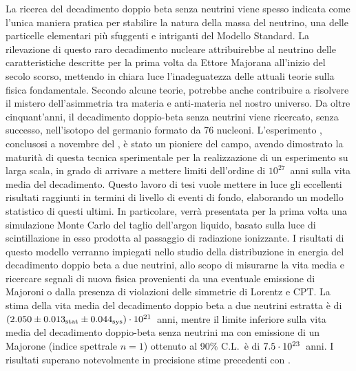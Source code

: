 
La ricerca del decadimento doppio beta senza neutrini viene spesso indicata come l'unica
maniera pratica per stabilire la natura della massa del neutrino, una delle particelle
elementari più sfuggenti e intriganti del Modello Standard. La rilevazione di questo raro
decadimento nucleare attribuirebbe al neutrino delle caratteristiche descritte per la
prima volta da Ettore Majorana all'inizio del secolo scorso, mettendo in chiara luce
l'inadeguatezza delle attuali teorie sulla fisica fondamentale. Secondo alcune teorie,
potrebbe anche contribuire a risolvere il mistero dell'asimmetria tra materia e
anti-materia nel nostro universo. Da oltre cinquant'anni, il decadimento doppio-beta senza
neutrini viene ricercato, senza successo, nell'isotopo del germanio formato da 76
nucleoni. L'esperimento \gerda, conclusosi a novembre del , è stato un pioniere
del campo, avendo dimostrato la maturità di questa tecnica sperimentale per la
realizzazione di un esperimento su larga scala, in grado di arrivare a mettere limiti
dell'ordine di $10^{27}$~anni sulla vita media del decadimento.  Questo lavoro di tesi
vuole mettere in luce gli eccellenti risultati raggiunti in termini di livello di eventi
di fondo, elaborando un modello statistico di questi ultimi. In particolare, verrà
presentata per la prima volta una simulazione Monte Carlo del taglio dell'argon liquido,
basato sulla luce di scintillazione in esso prodotta al passaggio di radiazione
ionizzante. I risultati di questo modello verranno impiegati nello studio della
distribuzione in energia del decadimento doppio beta a due neutrini, allo scopo di
misurarne la vita media e ricercare segnali di nuova fisica provenienti da una eventuale
emissione di Majoroni o dalla presenza di violazioni delle simmetrie di Lorentz e CPT. La
stima della vita media del decadimento doppio beta a due neutrini estratta è di
$(2.050 \pm {0.013}_\text{stat} \pm {0.044}_\text{sys}) \cdot 10^{21}$~anni, mentre il limite inferiore sulla vita media del decadimento
doppio-beta senza neutrini ma con emissione di un Majorone (indice spettrale $n=1$)
ottenuto al 90\% C.L.~è di $7.5 \cdot 10^{23}$~anni. I risultati superano
notevolmente in precisione stime precedenti con \gesix.

